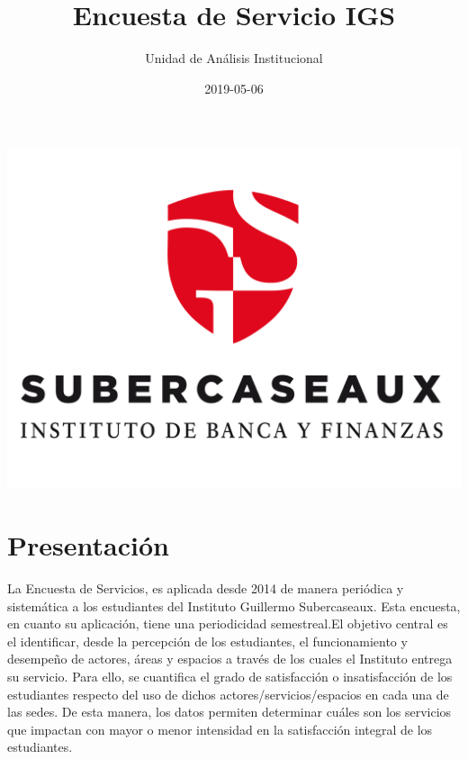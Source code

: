 \documentclass[]{book}
\title{Encuesta de Servicio IGS}
\author{Unidad de Análisis Institucional}
\date{2019-05-06}
\begin{document}
\maketitle

{
\setcounter{tocdepth}{1}
\tableofcontents
}
\chapter*{}\label{section}

\begin{center}\includegraphics{images/logoieb} \end{center}

\chapter*{Presentación}\label{presentacion}

La Encuesta de Servicios, es aplicada desde 2014 de manera periódica y
sistemática a los estudiantes del Instituto Guillermo Subercaseaux. Esta
encuesta, en cuanto su aplicación, tiene una periodicidad semestreal.El
objetivo central es el identificar, desde la percepción de los
estudiantes, el funcionamiento y desempeño de actores, áreas y espacios
a través de los cuales el Instituto entrega su servicio. Para ello, se
cuantifica el grado de satisfacción o insatisfacción de los estudiantes
respecto del uso de dichos actores/servicios/espacios en cada una de las
sedes. De esta manera, los datos permiten determinar cuáles son los
servicios que impactan con mayor o menor intensidad en la satisfacción
integral de los estudiantes.
\end{document}
